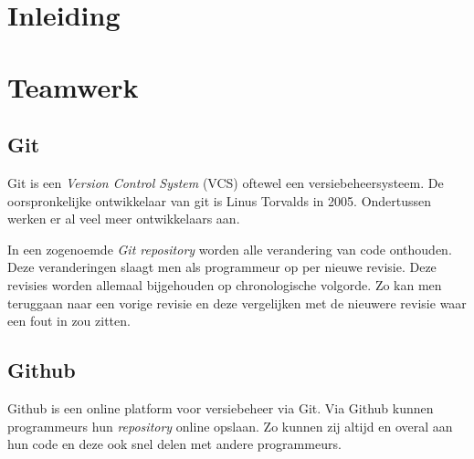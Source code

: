\section{Inleiding}

\section{Teamwerk}
\subsection{Git}
Git is een \textit{Version Control System} (VCS) oftewel een versiebeheersysteem. De oorspronkelijke ontwikkelaar van git is Linus Torvalds in 2005.\cite{init_git} Ondertussen werken er al veel meer ontwikkelaars aan. 

In een zogenoemde \textit{Git repository} worden alle verandering van code onthouden. Deze veranderingen slaagt men als programmeur op per nieuwe revisie. Deze revisies worden allemaal bijgehouden op chronologische volgorde. Zo kan men teruggaan naar een vorige revisie en deze vergelijken met de nieuwere revisie waar een fout in zou zitten.
\subsection{Github}
Github is een online platform voor versiebeheer via Git. Via Github kunnen programmeurs hun \textit{repository} online opslaan. Zo kunnen zij altijd en overal aan hun code en deze ook snel delen met andere programmeurs.
